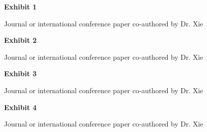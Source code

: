 \documentclass{article}
\begin{document}
\vspace*{\fill}

\begin{center}

{\LARGE \bf
Exhibit 1 
}

\vspace{10\baselineskip}

{\large Journal or international conference paper co-authored by Dr. Xie}

\end{center}
\vspace*{\fill}



\vspace*{\fill}

\begin{center}

{\LARGE \bf
Exhibit 2
}

\vspace{10\baselineskip}

{\large Journal or international conference paper co-authored by Dr. Xie}

\end{center}
\vspace*{\fill}



\vspace*{\fill}

\begin{center}

{\LARGE \bf
Exhibit 3
}

\vspace{10\baselineskip}

{\large Journal or international conference paper co-authored by Dr. Xie}

\end{center}
\vspace*{\fill}



\vspace*{\fill}

\begin{center}

{\LARGE \bf
Exhibit 4
}

\vspace{10\baselineskip}

{\large Journal or international conference paper co-authored by Dr. Xie}

\end{center}
\vspace*{\fill}
\end{document}
